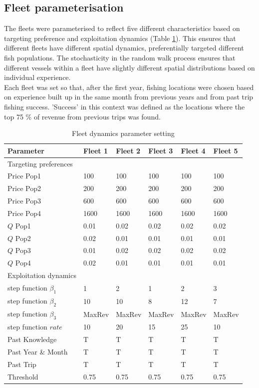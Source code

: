 \documentclass[review]{elsarticle}
\begin{document}
\subsection{Fleet parameterisation}

The fleets were parameterised to reflect five different characteristics based
on targeting preference and exploitation dynamics (Table \ref{tab:2}). This
ensures that different fleets have different spatial dynamics, preferentially
targeted different fish populations. The stochasticity in the random walk
process ensures that different vessels within a fleet have slightly different
spatial distributions based on individual experience. \\

Each fleet was set so that, after the first year, fishing locations were chosen
based on experience built up in the same month from previous years and from
past trip fishing success. 'Success' in this context was defined as the
locations where the top 75 \% of revenue from previous trips was found. \\

\begin{table}[!ht]
\caption{Fleet dynamics parameter setting}
\begin{tabular}{ p{4cm } p{1cm} p{1cm} p{1cm} p{1cm} p{1cm}}
	\hline
	Parameter & Fleet 1 & Fleet 2 & Fleet 3 & Fleet 4 & Fleet 5 \\
	\hline
	Targeting preferences &&&& \\
	\hline
	Price Pop1 & 100 & 100 & 100 & 100 & 100 \\
	Price Pop2 & 200 & 200 & 200 & 200 & 200 \\
	Price Pop3 & 600 & 600 & 600 & 600 & 600 \\
	Price Pop4 & 1600 & 1600 & 1600 & 1600 & 1600 \\
	$Q$ Pop1 & 0.01 & 0.02 & 0.02 & 0.02 & 0.02 \\
	$Q$ Pop2 & 0.02 & 0.01 & 0.01 & 0.01 & 0.01\\
	$Q$ Pop3 & 0.01 & 0.02 & 0.02 & 0.02 & 0.02 \\
	$Q$ Pop4 & 0.02 & 0.01 & 0.01 & 0.01 & 0.01 \\
	\hline
	Exploitation dynamics &&&& \\
	\hline
	step function $\beta_1$ & 1 & 2 & 1 & 2 & 3 \\
	step function $\beta_2$ & 10 & 10 & 8 & 12 & 7 \\
	step function $\beta_3$ & MaxRev & MaxRev & MaxRev & MaxRev & MaxRev \\
	step function $rate$ & 10 & 20 & 15 & 25 & 10 \\
	Past Knowledge & T & T & T & T & T \\
	Past Year \& Month & T & T & T & T & T \\
	Past Trip & T & T & T & T & T \\
	Threshold & 0.75 & 0.75 & 0.75 & 0.75 & 0.75 \\
	\hline
\end{tabular}
\label{tab:2}
\end{table}
\end{document}
